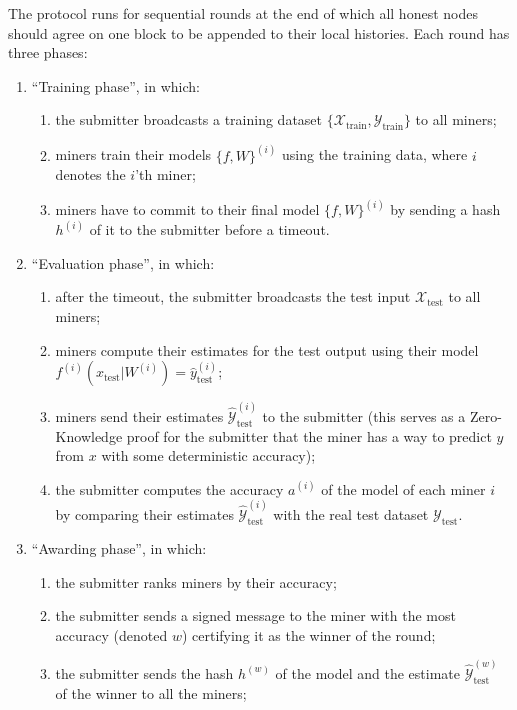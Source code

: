 \documentclass[conference]{IEEEtran}
\begin{document}
The protocol runs for sequential rounds at the end of which all honest nodes should agree on one block to be appended to their local histories. Each round has three phases:
\begin{enumerate}
    \item ``Training phase'', in which:
    \begin{enumerate}
        \item the submitter broadcasts a training dataset $\{\mathcal X_\text{train},\mathcal Y_\text{train}\}$ to all miners;
        \item miners train their models $\{f,W\}^{(i)}$ using the training data, where $i$ denotes the $i$'th miner;
        \item miners have to commit to their final model $\{f,W\}^{(i)}$ by sending a hash $h^{(i)}$ of it to the submitter before a timeout.
    \end{enumerate}
    \item ``Evaluation phase'', in which:
    \begin{enumerate}
        \item after the timeout, the submitter broadcasts the test input $\mathcal X_\text{test}$ to all miners;
        \item miners compute their estimates for the test output using their model $f^{(i)}(x_{\text{test}}|W^{(i)})=\hat y_{\text{test}}^{(i)}$;
        \item miners send their estimates $\hat{\mathcal Y}_{\text{test}}^{(i)}$ to the submitter (this serves as a Zero-Knowledge proof for the submitter that the miner has a way to predict $y$ from $x$ with some deterministic accuracy);
        \item the submitter computes the accuracy $a^{(i)}$ of the model of each miner $i$ by comparing their estimates $\hat{\mathcal Y}_{\text{test}}^{(i)}$ with the real test dataset $\mathcal Y_{\text{test}}$.
    \end{enumerate}
    \item ``Awarding phase'', in which:
    \begin{enumerate}
        \item the submitter ranks miners by their accuracy;
        \item the submitter sends a signed message to the miner with the most accuracy (denoted $w$) certifying it as the winner of the round;
        \item the submitter sends the hash $h^{(w)}$ of the model and the estimate $\hat{\mathcal Y}_{\text{test}}^{(w)}$ of the winner to all the miners;

\end{enumerate}
\end{enumerate}
\end{document}
